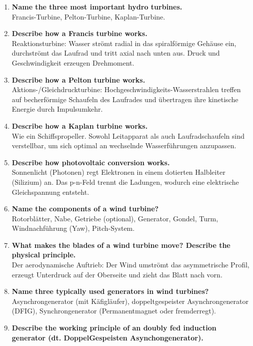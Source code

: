 \documentclass{article}
\begin{document}
\begin{enumerate}
    Bei lokalem Unterdruck verdampft Wasser. Steigt der Druck wieder, implodieren diese Dampfblasen schlagartig und reißen Material aus den Turbinenschaufeln.
    \item \textbf{Name the three most important hydro turbines.} \\
    Francis-Turbine, Pelton-Turbine, Kaplan-Turbine.
    \item \textbf{Describe how a Francis turbine works.} \\
    Reaktionsturbine: Wasser strömt radial in das spiralförmige Gehäuse ein, durchströmt das Laufrad und tritt axial nach unten aus. Druck und Geschwindigkeit erzeugen Drehmoment.
    \item \textbf{Describe how a Pelton turbine works.} \\
    Aktions-/Gleichdruckturbine: Hochgeschwindigkeits-Wasserstrahlen treffen auf becherförmige Schaufeln des Laufrades und übertragen ihre kinetische Energie durch Impulsumkehr.
    \item \textbf{Describe how a Kaplan turbine works.} \\
    Wie ein Schiffspropeller. Sowohl Leitapparat als auch Laufradschaufeln sind verstellbar, um sich optimal an wechselnde Wasserführungen anzupassen.
    \item \textbf{Describe how photovoltaic conversion works.} \\
    Sonnenlicht (Photonen) regt Elektronen in einem dotierten Halbleiter (Silizium) an. Das p-n-Feld trennt die Ladungen, wodurch eine elektrische Gleichspannung entsteht.
    \item \textbf{Name the components of a wind turbine?} \\
    Rotorblätter, Nabe, Getriebe (optional), Generator, Gondel, Turm, Windnachführung (Yaw), Pitch-System.
    \item \textbf{What makes the blades of a wind turbine move? Describe the physical principle.} \\
    Der aerodynamische Auftrieb: Der Wind umströmt das asymmetrische Profil, erzeugt Unterdruck auf der Oberseite und zieht das Blatt nach vorn.
    \item \textbf{Name three typically used generators in wind turbines?} \\
    Asynchrongenerator (mit Käfigläufer), doppeltgespeister Asynchrongenerator (DFIG), Synchrongenerator (Permanentmagnet oder fremderregt).
    \item \textbf{Describe the working principle of an doubly fed induction generator (dt. DoppelGespeisten Asynchongenerator).} \\

\end{enumerate}
\end{document}

